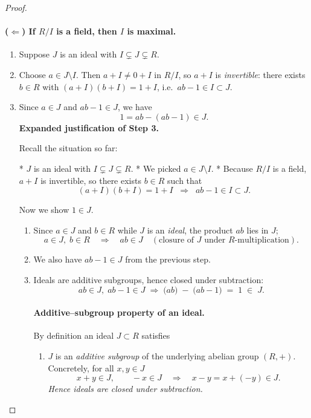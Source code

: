 \documentclass[12pt]{article}
\theoremstyle{definition} %
\theoremstyle{plain} %
\begin{document}
\begin{proof}
  \paragraph{(\(\Longleftarrow\)) If \(R/I\) is a field, then \(I\) is maximal.}
  \begin{enumerate}
    \item Suppose \(J\) is an ideal with \(I\subsetneq J\subsetneq R\).
    \item Choose \(a\in J\setminus I\).  
          Then \(a+I\neq 0+I\) in \(R/I\), so \(a+I\) is \emph{invertible}:
          there exists \(b\in R\) with \((a+I)(b+I)=1+I\), i.e.\ \(ab-1\in I\subset J\).
    \item Since \(a\in J\) and \(ab-1\in J\), we have
          \[
             1 = ab-(ab-1)\in J .
          \]
          \textbf{Expanded justification of Step 3.}

Recall the situation so far:

* \(J\) is an ideal with \(I\subsetneq J\subsetneq R\).
* We picked \(a\in J\setminus I\).
* Because \(R/I\) is a field, \(a+I\) is invertible, so there exists \(b\in R\) such that
  \[
    (a+I)(b+I)=1+I
    \;\;\Longrightarrow\;\;
    ab-1\in I\subset J .
  \]

Now we show \(1\in J\).

\begin{enumerate}
  \item Since \(a\in J\) and \(b\in R\) while \(J\) is an \emph{ideal}, the product
        \(ab\) lies in \(J\);
        \[
          a\in J,\; b\in R 
          \quad\Longrightarrow\quad
          ab\in J 
          \quad
          (\text{closure of }J\text{ under }R\text{-multiplication}).
        \]
  \item We also have \(ab-1\in J\) from the previous step.
  \item Ideals are additive subgroups, hence closed under subtraction:
        \[
          ab\in J,\; ab-1\in J
          \;\Longrightarrow\;
          \bigl(ab\bigr) \;-\; \bigl(ab-1\bigr)
          \;=\;
          1 
          \;\in\; J .
        \]
\paragraph*{Additive–subgroup property of an ideal.}
By definition an ideal \(J\subset R\) satisfies
\begin{enumerate}
  \item \(J\) is an \emph{additive subgroup} of the underlying abelian
        group \((R,+)\).  
        Concretely, for all \(x,y\in J\)
        \[
            x+y\in J,
            \qquad
            -x\in J
            \quad\Longrightarrow\quad
            x-y = x + (-y)\in J .
        \]
        \emph{Hence ideals are closed under subtraction.}


\end{enumerate}
\end{enumerate}
\end{enumerate}
\end{proof}
\end{document}
